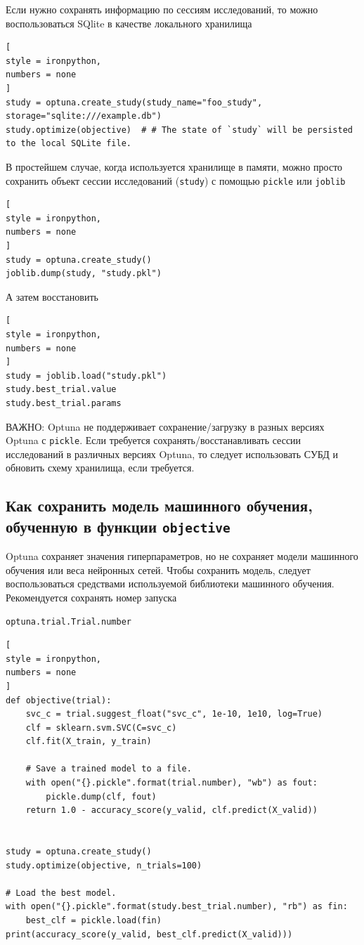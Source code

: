 \documentclass[%
	11pt,
	a4paper,
	utf8,
		]{article}
\begin{document}
Если нужно сохранять информацию по сессиям исследований, то можно воспользоваться SQlite в качестве локального хранилища
\begin{lstlisting}[
style = ironpython,
numbers = none
]
study = optuna.create_study(study_name="foo_study", storage="sqlite:///example.db")
study.optimize(objective)  # # The state of `study` will be persisted to the local SQLite file.
\end{lstlisting}

В простейшем случае, когда используется хранилище в памяти, можно просто сохранить объект сессии исследований (\verb|study|) с помощью \verb|pickle| или \verb|joblib|
\begin{lstlisting}[
style = ironpython,
numbers = none
]
study = optuna.create_study()
joblib.dump(study, "study.pkl")
\end{lstlisting}

А затем восстановить
\begin{lstlisting}[
style = ironpython,
numbers = none
]
study = joblib.load("study.pkl")
study.best_trial.value
study.best_trial.params
\end{lstlisting}

ВАЖНО: Optuna не поддерживает сохранение/загрузку в разных версиях Optuna с \verb|pickle|. Если требуется сохранять/восстанавливать сессии исследований в различных версиях Optuna, то следует использовать СУБД и обновить схему хранилища, если требуется.

\subsection{Как сохранить модель машинного обучения, обученную в функции \texttt{objective}}

Optuna сохраняет значения гиперпараметров, но не сохраняет модели машинного обучения или веса нейронных сетей. Чтобы сохранить модель, следует воспользоваться средствами используемой библиотеки машинного обучения. Рекомендуется сохранять номер запуска

\verb|optuna.trial.Trial.number|
\begin{lstlisting}[
style = ironpython,
numbers = none
]
def objective(trial):
	svc_c = trial.suggest_float("svc_c", 1e-10, 1e10, log=True)
	clf = sklearn.svm.SVC(C=svc_c)
	clf.fit(X_train, y_train)
	
	# Save a trained model to a file.
	with open("{}.pickle".format(trial.number), "wb") as fout:
		pickle.dump(clf, fout)
	return 1.0 - accuracy_score(y_valid, clf.predict(X_valid))


study = optuna.create_study()
study.optimize(objective, n_trials=100)

# Load the best model.
with open("{}.pickle".format(study.best_trial.number), "rb") as fin:
	best_clf = pickle.load(fin)
print(accuracy_score(y_valid, best_clf.predict(X_valid)))
\end{lstlisting}
\end{document}
